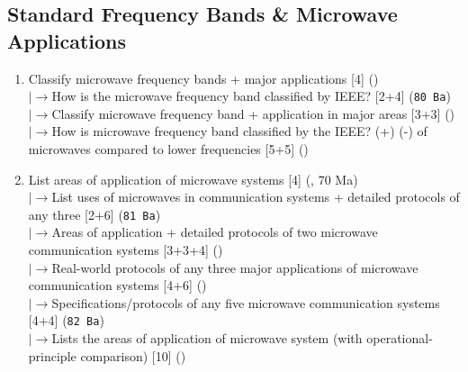 \documentclass[12pt]{article}
\newcommand{\lb}{\\$\left|\rightarrow\right.$}
\begin{document}
  \subsection{Standard Frequency Bands \& Microwave Applications}
    \begin{enumerate}[topsep=0pt, noitemsep]
      \item Classify microwave frequency bands + major applications \hfill [4] ()
        \lb How is the microwave frequency band classified by IEEE? \hfill [2+4] (\texttt{80 Ba})
        \lb Classify microwave frequency band + application in major areas \hfill [3+3] ()
        \lb How is microwave frequency band classified by the IEEE? (+) (-) of microwaves compared to lower frequencies \hfill [5+5] ()
      \item List areas of application of microwave systems \hfill [4] (, 70 Ma)
        \lb List uses of microwaves in communication systems + detailed protocols of any three \hfill [2+6] (\texttt{81 Ba})
        \lb Areas of application + detailed protocols of two microwave communication systems \hfill [3+3+4] ()
        \lb Real-world protocols of any three major applications of microwave communication systems \hfill [4+6] ()
        \lb Specifications/protocols of any five microwave communication systems \hfill [4+4] (\texttt{82 Ba})
        \lb Lists the areas of application of microwave system (with operational-principle comparison) \hfill [10] ()
    \end{enumerate}
\end{document}
